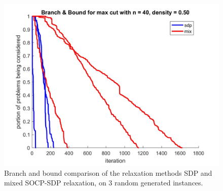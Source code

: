 \documentclass[12pt]{book}
\theoremstyle{definition}
\begin{document}

\begin{figure}
\centering
\includegraphics[scale=0.25]{img/compbnb_n40_d50_cons4.jpg}
\caption[Branch and bound comparison of the relaxation methods]{Branch and bound comparison of the relaxation methods SDP and mixed SOCP-SDP relaxation, on 3 random generated instances. }
\label{Figurebnb3}
\end{figure}
\end{document}
